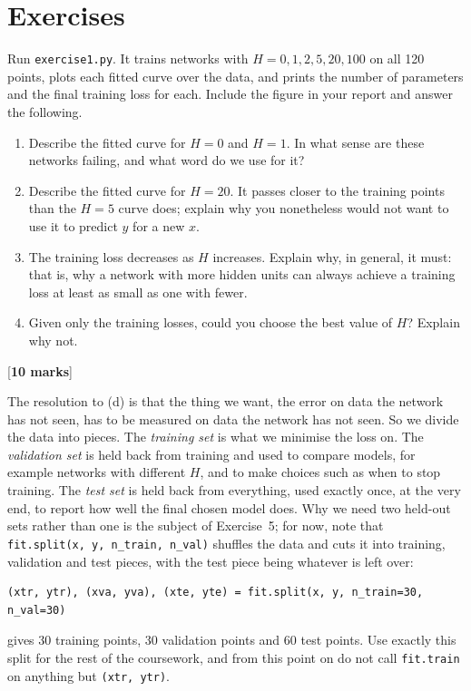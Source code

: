 \documentclass[11pt,a4paper]{article}
\newcounter{exercise}
\newenvironment{exercise}[1]{\refstepcounter{exercise}\begin{tcolorbox}[colback=blue!4,colframe=blue!50!black,title=Exercise \theexercise: #1,fonttitle=\bfseries]}{\end{tcolorbox}}
\newcommand{\mk}[1]{\hfill[\textbf{#1 marks}]}
\begin{document}
\section*{Exercises}

\begin{exercise}{fitting all the data}
Run \texttt{exercise1.py}. It trains networks with $H = 0, 1, 2, 5, 20, 100$ on all 120 points, plots each fitted curve over the data, and prints the number of parameters and the final training loss for each. Include the figure in your report and answer the following.
\begin{enumerate}[label=(\alph*)]
\item Describe the fitted curve for $H = 0$ and $H = 1$. In what sense are these networks failing, and what word do we use for it?
\item Describe the fitted curve for $H = 20$. It passes closer to the training points than the $H = 5$ curve does; explain why you nonetheless would not want to use it to predict $y$ for a new $x$.
\item The training loss decreases as $H$ increases. Explain why, in general, it must: that is, why a network with more hidden units can always achieve a training loss at least as small as one with fewer.
\item Given only the training losses, could you choose the best value of $H$? Explain why not.
\end{enumerate}
\mk{10}
\end{exercise}

The resolution to (d) is that the thing we want, the error on data the network has not seen, has to be measured on data the network has not seen. So we divide the data into pieces. The \emph{training set} is what we minimise the loss on. The \emph{validation set} is held back from training and used to compare models, for example networks with different $H$, and to make choices such as when to stop training. The \emph{test set} is held back from everything, used exactly once, at the very end, to report how well the final chosen model does. Why we need two held-out sets rather than one is the subject of Exercise~5; for now, note that \texttt{fit.split(x, y, n\_train, n\_val)} shuffles the data and cuts it into training, validation and test pieces, with the test piece being whatever is left over:
\begin{lstlisting}
(xtr, ytr), (xva, yva), (xte, yte) = fit.split(x, y, n_train=30, n_val=30)
\end{lstlisting}
gives 30 training points, 30 validation points and 60 test points. Use exactly this split for the rest of the coursework, and from this point on do not call \texttt{fit.train} on anything but \texttt{(xtr, ytr)}.
\end{document}
